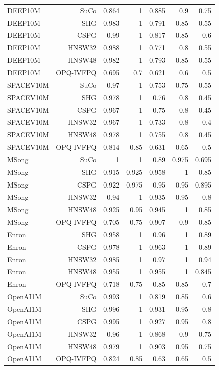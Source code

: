 \begin{table}[t]
\begin{tabular}{lrrrrrr}
DEEP10M & SuCo & 0.864 & 1 & 0.885 & 0.9 & 0.75 \\
DEEP10M & SHG & 0.983 & 1 & 0.791 & 0.85 & 0.55 \\
DEEP10M & CSPG & 0.99 & 1 & 0.817 & 0.85 & 0.6 \\
DEEP10M & HNSW32 & 0.988 & 1 & 0.771 & 0.8 & 0.55 \\
DEEP10M & HNSW48 & 0.982 & 1 & 0.793 & 0.85 & 0.55 \\
DEEP10M & OPQ-IVFPQ & 0.695 & 0.7 & 0.621 & 0.6 & 0.5 \\
SPACEV10M & SuCo & 0.97 & 1 & 0.753 & 0.75 & 0.55 \\
SPACEV10M & SHG & 0.978 & 1 & 0.76 & 0.8 & 0.45 \\
SPACEV10M & CSPG & 0.967 & 1 & 0.75 & 0.8 & 0.45 \\
SPACEV10M & HNSW32 & 0.967 & 1 & 0.733 & 0.8 & 0.4 \\
SPACEV10M & HNSW48 & 0.978 & 1 & 0.755 & 0.8 & 0.45 \\
SPACEV10M & OPQ-IVFPQ & 0.814 & 0.85 & 0.631 & 0.65 & 0.5 \\
MSong & SuCo & 1 & 1 & 0.89 & 0.975 & 0.695 \\
MSong & SHG & 0.915 & 0.925 & 0.958 & 1 & 0.85 \\
MSong & CSPG & 0.922 & 0.975 & 0.95 & 0.95 & 0.895 \\
MSong & HNSW32 & 0.94 & 1 & 0.935 & 0.95 & 0.8 \\
MSong & HNSW48 & 0.925 & 0.95 & 0.945 & 1 & 0.85 \\
MSong & OPQ-IVFPQ & 0.705 & 0.75 & 0.907 & 0.9 & 0.85 \\
Enron & SHG & 0.958 & 1 & 0.96 & 1 & 0.89 \\
Enron & CSPG & 0.978 & 1 & 0.963 & 1 & 0.89 \\
Enron & HNSW32 & 0.985 & 1 & 0.97 & 1 & 0.94 \\
Enron & HNSW48 & 0.955 & 1 & 0.955 & 1 & 0.845 \\
Enron & OPQ-IVFPQ & 0.718 & 0.75 & 0.85 & 0.85 & 0.7 \\
OpenAI1M & SuCo & 0.993 & 1 & 0.819 & 0.85 & 0.6 \\
OpenAI1M & SHG & 0.996 & 1 & 0.931 & 0.95 & 0.8 \\
OpenAI1M & CSPG & 0.995 & 1 & 0.927 & 0.95 & 0.8 \\
OpenAI1M & HNSW32 & 0.96 & 1 & 0.868 & 0.9 & 0.75 \\
OpenAI1M & HNSW48 & 0.979 & 1 & 0.903 & 0.95 & 0.75 \\
OpenAI1M & OPQ-IVFPQ & 0.824 & 0.85 & 0.63 & 0.65 & 0.5 \\

\end{tabular}
\end{table}
